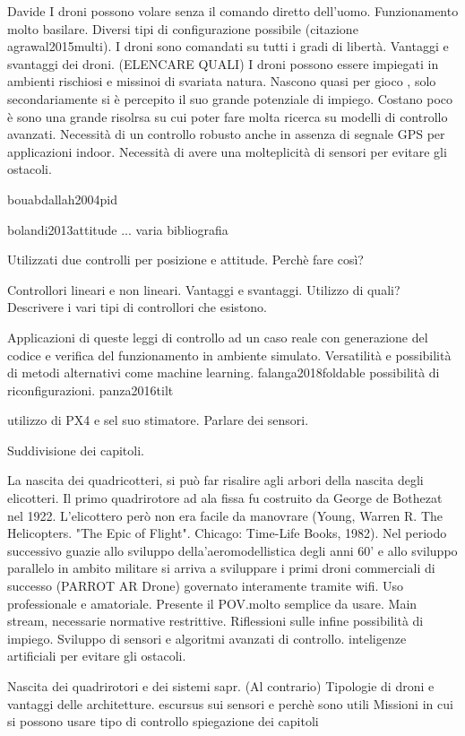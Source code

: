 \begin{commento}
	Davide 
	I droni possono volare senza il comando diretto dell'uomo. 
	Funzionamento molto basilare.
	Diversi tipi di configurazione possibile (citazione agrawal2015multi).
	I droni sono comandati su tutti i gradi di libertà.
	Vantaggi e svantaggi dei droni. (ELENCARE QUALI)
	I droni possono essere impiegati in ambienti rischiosi e missinoi di svariata natura.
	Nascono quasi per gioco , solo secondariamente si è percepito il suo grande potenziale di impiego.
	Costano poco è sono una grande risolrsa su cui poter fare molta ricerca su modelli di controllo avanzati.
	Necessità di un controllo robusto anche in assenza di segnale GPS per applicazioni indoor.
	Necessità di avere una molteplicità di sensori per evitare gli ostacoli.
	
	bouabdallah2004pid
	
	bolandi2013attitude ... varia bibliografia
	
	Utilizzati due controlli per posizione e attitude. Perchè fare così?
	
	Controllori lineari e non lineari. Vantaggi e svantaggi. Utilizzo di quali? Descrivere i vari tipi di controllori che esistono.
	
	Applicazioni di queste leggi di controllo ad un caso reale con generazione del codice e verifica del funzionamento in ambiente simulato.
	Versatilità e possibilità di metodi alternativi come machine learning.
	falanga2018foldable possibilità di riconfigurazioni. panza2016tilt
	
	utilizzo di PX4 e sel suo stimatore.
	Parlare dei sensori.
	
	Suddivisione dei capitoli.
\end{commento}
\begin{commento}
	La nascita dei quadricotteri, si può far risalire agli arbori della nascita degli elicotteri.
	Il primo quadrirotore ad ala fissa fu costruito da George de Bothezat nel 1922. L'elicottero però non era facile da manovrare (Young, Warren R. The Helicopters. "The Epic of Flight". Chicago: Time-Life Books, 1982).
	Nel periodo successivo guazie allo sviluppo della'aeromodellistica degli anni 60' e allo sviluppo parallelo in ambito militare si arriva a sviluppare i primi droni commerciali di successo (PARROT AR Drone) governato interamente tramite wifi. Uso professionale e amatoriale. Presente il POV.molto semplice da usare. Main stream, necessarie normative restrittive. Riflessioni sulle infine possibilità di impiego. Sviluppo di sensori e algoritmi avanzati di controllo. inteligenze artificiali per evitare gli ostacoli.
\end{commento}

\begin{scaletta}
	Nascita dei quadrirotori e dei sistemi sapr. (Al contrario)
	Tipologie di droni e vantaggi delle architetture. escursus sui sensori e perchè sono utili
	Missioni in cui si possono usare
	tipo di controllo
	spiegazione dei capitoli
\end{scaletta}



